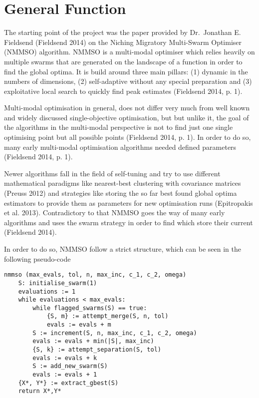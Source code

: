 \documentclass[12pt,a4paper]{article}
\begin{document}
\section{General Function}\label{general-function}

The starting point of the project was the paper provided by Dr.~Jonathan
E. Fieldsend (Fieldsend 2014) on the Niching Migratory Multi-Swarm
Optimiser (NMMSO) algorithm. NMMSO is a multi-modal optimiser which
relies heavily on multiple swarms that are generated on the landscape of
a function in order to find the global optima. It is build around three
main pillars: (1) dynamic in the numbers of dimensions, (2)
self-adaptive without any special preparation and (3) exploitative local
search to quickly find peak estimates (Fieldsend 2014, p. 1).

Multi-modal optimisation in general, does not differ very much from well
known and widely discussed single-objective optimisation, but but unlike
it, the goal of the algorithms in the multi-modal perspective is not to
find just one single optimising point but all possible points (Fieldsend
2014, p. 1). In order to do so, many early multi-modal optimisation
algorithms needed defined parameters (Fieldsend 2014, p. 1).

Newer algorithms fall in the field of self-tuning and try to use
different mathematical paradigms like nearest-best clustering with
covariance matrices (Preuss 2012) and strategies like storing the so far
best found global optima estimators to provide them as parameters for
new optimisation runs (Epitropakis et al. 2013). Contradictory to that
NMMSO goes the way of many early algorithms and uses the swarm strategy
in order to find which store their current (Fieldsend 2014).

In order to do so, NMMSO follow a strict structure, which can be seen in
the following pseudo-code

\begin{verbatim}
nmmso (max_evals, tol, n, max_inc, c_1, c_2, omega)
    S: initialise_swarm(1)
    evaluations := 1
    while evaluations < max_evals:
        while flagged_swarms(S) == true:
            {S, m} := attempt_merge(S, n, tol)
            evals := evals + m
        S := increment(S, n, max_inc, c_1, c_2, omega)
        evals := evals + min(|S|, max_inc)
        {S, k} := attempt_separation(S, tol)
        evals := evals + k
        S := add_new_swarm(S)
        evals := evals + 1
    {X*, Y*} := extract_gbest(S)
    return X*,Y*
\end{verbatim}
\end{document}

